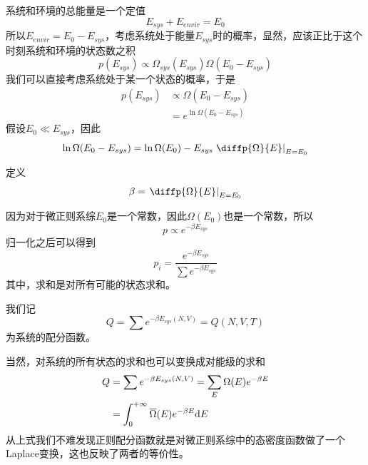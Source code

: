 系统和环境的总能量是一个定值\begin{equation}
       E_{sys}+E_{envir}=E_0
\end{equation}
所以$E_{envir}=E_0-E_{sys}$，考虑系统处于能量$E_{sys}$时的概率，显然，应该正比于这个时刻系统和环境的状态数之积
\begin{equation}
       p(E_{sys})\propto \Omega_{sys}(E_{sys})\Omega(E_{0}-E_{sys})
\end{equation}
我们可以直接考虑系统处于某一个状态的概率，于是\begin{equation}
\begin{aligned}
       p(E_{sys})&\propto \Omega(E_{0}-E_{sys})\\
       &=e^{\ln \Omega(E_{0}-E_{sys})}
\end{aligned}
\end{equation}
假设$E_0\ll E_{sys}$，因此
\begin{equation}
       \ln \Omega(E_{0}-E_{sys})=\ln \Omega(E_0)-E_{sys} \left.\diffp{\Omega}{E}\right|_{E=E_0}
\end{equation}
\begin{definition}
       定义\begin{equation}
              \beta=\left.\diffp{\Omega}{E}\right|_{E=E_0}
       \end{equation}
\end{definition}
因为对于微正则系综$E_0$是一个常数，因此$\Omega(E_0)$也是一个常数，所以\begin{equation}
       p\propto e^{-\beta E_{sys}}
\end{equation}
归一化之后可以得到\begin{equation}
       p_i =\frac{\displaystyle e^{-\beta E_{sys}}}{\displaystyle \sum e^{-\beta E_{sys}}}
\end{equation}其中，求和是对所有可能的状态求和。

\begin{definition}
       我们记\begin{equation}
              Q=\sum e^{-\beta E_{sys}(N,V)}=Q(N,V,T)
       \end{equation}
       为系统的配分函数。
\end{definition}

当然，对系统的所有状态的求和也可以变换成对能级的求和\begin{equation}
      \begin{aligned}
       Q&=\sum e^{-\beta E_{sys}(N,V)}=\sum_{E}\Omega(E) e^{-\beta E}\\
       &=\int_0^{+\infty} \overline{\Omega}(E) e^{-\beta E} \mathrm{d} E 
      \end{aligned} 
\end{equation}
从上式我们不难发现正则配分函数就是对微正则系综中的态密度函数做了一个Laplace变换，这也反映了两者的等价性。

